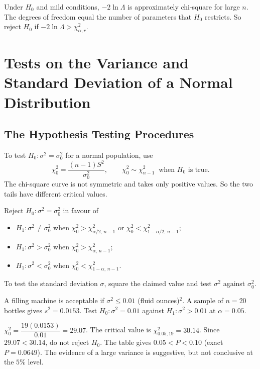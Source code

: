 \begin{theorem}\label{thm:wilks}
Under $H_0$ and mild conditions, $-2\ln\Lambda$ is approximately chi-square for large $n$. The degrees of freedom equal the number of parameters that $H_0$ restricts. So reject $H_0$ if $-2\ln\Lambda>\chi^2_{\alpha,r}$.
\end{theorem}

\section{Tests on the Variance and Standard Deviation of a Normal Distribution}

\subsection{The Hypothesis Testing Procedures}

To test $H_0:\sigma^2=\sigma_0^2$ for a normal population, use
\[ \chi_0^2=\frac{(n-1)S^2}{\sigma_0^2},\qquad \chi_0^2\sim\chi^2_{n-1}\ \text{ when }H_0\text{ is true.} \]
The chi-square curve is not symmetric and takes only positive values. So the two tails have different critical values.

\begin{theorem}\label{thm:chisqtest}
Reject $H_0:\sigma^2=\sigma_0^2$ in favour of
\begin{itemize}
  \item $H_1:\sigma^2\ne\sigma_0^2$ when $\chi_0^2>\chi^2_{\alpha/2,\,n-1}$ or $\chi_0^2<\chi^2_{1-\alpha/2,\,n-1}$;
  \item $H_1:\sigma^2>\sigma_0^2$ when $\chi_0^2>\chi^2_{\alpha,\,n-1}$;
  \item $H_1:\sigma^2<\sigma_0^2$ when $\chi_0^2<\chi^2_{1-\alpha,\,n-1}$.
\end{itemize}
To test the standard deviation $\sigma$, square the claimed value and test $\sigma^2$ against $\sigma_0^2$.
\end{theorem}

\begin{example}\label{ex:vartest}
A filling machine is acceptable if $\sigma^2\le0.01$ (fluid ounces)$^2$. A sample of $n=20$ bottles gives $s^2=0.0153$. Test $H_0:\sigma^2=0.01$ against $H_1:\sigma^2>0.01$ at $\alpha=0.05$.

$\chi_0^2=\dfrac{19(0.0153)}{0.01}=29.07$. The critical value is $\chi^2_{0.05,19}=30.14$. Since $29.07<30.14$, do not reject $H_0$. The table gives $0.05<P<0.10$ (exact $P=0.0649$). The evidence of a large variance is suggestive, but not conclusive at the $5\%$ level.
\end{example}

